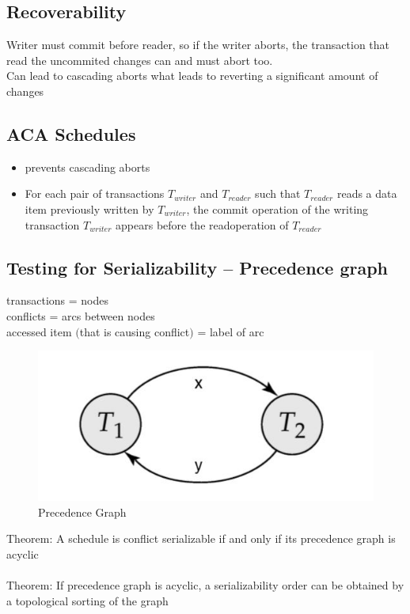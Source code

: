 			\pagebreak
			
		\subsection{Recoverability}
			Writer must commit before reader, so if the writer aborts, the transaction that read the uncommited changes can and must abort too.\\
			Can lead to cascading aborts what leads to reverting a significant amount of changes
		\subsection{ACA Schedules}
			\begin{itemize}
				\item prevents cascading aborts
				\item For each pair of transactions $ T_{writer} $ and $ T_{reader} $ such that $ T_{reader} $ reads a data item previously written by $ T_{writer} $, the commit operation of the writing  transaction $ T_{writer} $ appears before the readoperation of $ T_{reader} $ 
			\end{itemize}
		\subsection{Testing for Serializability -- Precedence graph}
			transactions = nodes \\
			conflicts = arcs between nodes\\
			accessed item $ ( $that is causing conflict$) $ = label of arc\\
			
			\begin{figure}[h!]
				\includegraphics[scale=0.5]{res/precedence_graph_serializable.jpg}
				\caption{Precedence Graph}
			\end{figure}

		Theorem: A schedule is conflict serializable if and only if its precedence graph is acyclic\\
		\\
		Theorem: If precedence graph is acyclic, a serializability order can be obtained by a topological sorting of the graph
		
